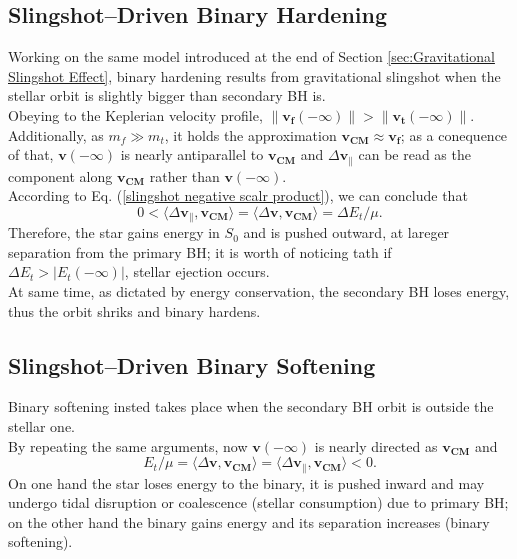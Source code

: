 \documentclass[12pt,twoside,openany]{book}
\begin{document}
\subsection{Slingshot–Driven Binary Hardening}\label{sec:Slingshot–Driven Binary Hardening}
 Working on the same model introduced at the end of Section \ref{sec:Gravitational Slingshot Effect}, binary hardening results from gravitational slingshot when the stellar orbit is slightly bigger than secondary BH is.\\Obeying to the Keplerian velocity profile, $\|\mathbf{v_f}(-\infty) \|> \|\mathbf{v_t}(-\infty) \|$. Additionally, as $m_f\gg m_t$, it holds the approximation $\mathbf{v_{CM}}\approx \mathbf{v_f}$; as a conequence of that, $\mathbf{v}(-\infty)$ is nearly antiparallel to $\mathbf{v_{CM}}$ and $\Delta\mathbf{v}_\parallel$ can be read as the component along $\mathbf{v_{CM}}$ rather than $\mathbf{v}(-\infty)$.\\According to Eq. (\ref{slingshot negative scalr product}), we can conclude that
\begin{equation}
    0<\langle \Delta\mathbf{v}_\parallel, \mathbf{v_{CM}} \rangle=\langle \Delta\mathbf{v}, \mathbf{v_{CM}}\rangle=\Delta E_t/\mu.
\end{equation}
Therefore, the star gains energy in $S_0$ and is pushed outward, at lareger separation from the primary BH; it is worth of noticing tath if $\Delta E_t>|E_t(-\infty)|$, stellar ejection occurs.\\At same time, as dictated by energy conservation, the secondary BH loses energy, thus the orbit shriks and  binary hardens\cite{Ciotti_2021}.
\subsection{Slingshot–Driven Binary Softening}
Binary softening insted takes place when the secondary BH orbit is outside the stellar one.\\By repeating the same arguments, now $\mathbf{v}(-\infty)$ is nearly directed as $\mathbf{v_{CM}}$ and
\begin{equation}
     E_t/\mu=\langle \Delta\mathbf{v}, \mathbf{v_{CM}}\rangle=\langle \Delta\mathbf{v}_\parallel, \mathbf{v_{CM}} \rangle<0.
\end{equation}
On one hand the star loses energy to the binary, it is pushed inward and may undergo tidal disruption or coalescence (stellar consumption) due to primary BH; on the other hand the binary gains energy and its separation increases (binary softening).
\end{document}
